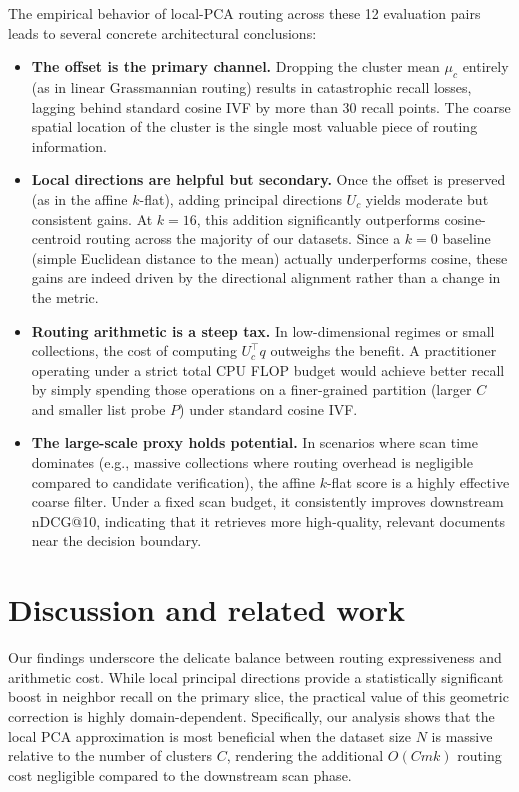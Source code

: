 \documentclass[sigconf,nonacm]{acmart}
\begin{document}
The empirical behavior of local-PCA routing across these 12 evaluation pairs leads to several concrete architectural conclusions:
\begin{itemize}
  \item \textbf{The offset is the primary channel.} Dropping the cluster mean $\mu_c$ entirely (as in linear Grassmannian routing) results in catastrophic recall losses, lagging behind standard cosine IVF by more than 30 recall points. The coarse spatial location of the cluster is the single most valuable piece of routing information.
  \item \textbf{Local directions are helpful but secondary.} Once the offset is preserved (as in the affine $k$-flat), adding principal directions $U_c$ yields moderate but consistent gains. At $k=16$, this addition significantly outperforms cosine-centroid routing across the majority of our datasets. Since a $k=0$ baseline (simple Euclidean distance to the mean) actually underperforms cosine, these gains are indeed driven by the directional alignment rather than a change in the metric.
  \item \textbf{Routing arithmetic is a steep tax.} In low-dimensional regimes or small collections, the cost of computing $U_c^\top q$ outweighs the benefit. A practitioner operating under a strict total CPU FLOP budget would achieve better recall by simply spending those operations on a finer-grained partition (larger $C$ and smaller list probe $P$) under standard cosine IVF.
  \item \textbf{The large-scale proxy holds potential.} In scenarios where scan time dominates (e.g., massive collections where routing overhead is negligible compared to candidate verification), the affine $k$-flat score is a highly effective coarse filter. Under a fixed scan budget, it consistently improves downstream nDCG@10, indicating that it retrieves more high-quality, relevant documents near the decision boundary.
\end{itemize}

\section{Discussion and related work}
\label{sec:discuss}

Our findings underscore the delicate balance between routing expressiveness and arithmetic cost. While local principal directions provide a statistically significant boost in neighbor recall on the primary slice, the practical value of this geometric correction is highly domain-dependent. Specifically, our analysis shows that the local PCA approximation is most beneficial when the dataset size $N$ is massive relative to the number of clusters $C$, rendering the additional $O(Cmk)$ routing cost negligible compared to the downstream scan phase.
\end{document}
